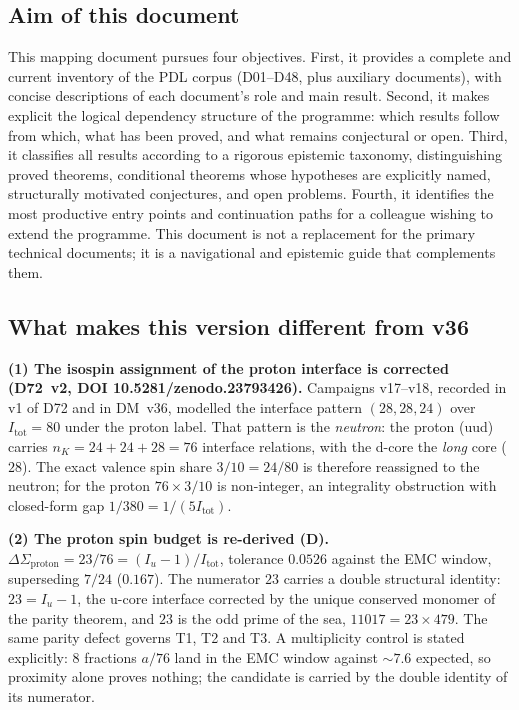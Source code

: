 \documentclass[11pt,a4paper]{article}
\theoremstyle{plain}
\theoremstyle{definition}
\theoremstyle{remark}
\begin{document}
\subsection{Aim of this document}
\label{subsec:aim}
This mapping document pursues four objectives. First, it provides a complete and current inventory of the PDL corpus (D01--D48, plus auxiliary documents), with concise descriptions of each document's role and main result. Second, it makes explicit the logical dependency structure of the programme: which results follow from which, what has been proved, and what remains conjectural or open. Third, it classifies all results according to a rigorous epistemic taxonomy, distinguishing proved theorems, conditional theorems whose hypotheses are explicitly named, structurally motivated conjectures, and open problems. Fourth, it identifies the most productive entry points and continuation paths for a colleague wishing to extend the programme. This document is not a replacement for the primary technical documents; it is a navigational and epistemic guide that complements them.

\subsection{What makes this version different from v36}
\label{sec:newv37}

\textbf{(1) The isospin assignment of the proton interface is corrected (D72~v2, DOI 10.5281/zenodo.23793426).} Campaigns v17--v18, recorded in v1 of D72 and in DM~v36, modelled the interface pattern $(28,28,24)$ over $I_{\mathrm{tot}}=80$ under the proton label. That pattern is the \emph{neutron}: the proton (uud) carries $n_{K}=24+24+28=76$ interface relations, with the d-core the \emph{long} core ($28$). The exact valence spin share $3/10=24/80$ is therefore reassigned to the neutron; for the proton $76\times3/10$ is non-integer, an integrality obstruction with closed-form gap $1/380=1/(5I_{\mathrm{tot}})$.

\textbf{(2) The proton spin budget is re-derived (D).} $\Delta\Sigma_{\mathrm{proton}}=23/76=(I_u-1)/I_{\mathrm{tot}}$, tolerance $0.0526$ against the EMC window, superseding $7/24$ ($0.167$). The numerator $23$ carries a double structural identity: $23=I_u-1$, the u-core interface corrected by the unique conserved monomer of the parity theorem, and $23$ is the odd prime of the sea, $11017=23\times479$. The same parity defect governs T1, T2 and T3. A multiplicity control is stated explicitly: $8$ fractions $a/76$ land in the EMC window against $\sim7.6$ expected, so proximity alone proves nothing; the candidate is carried by the double identity of its numerator.
\end{document}
